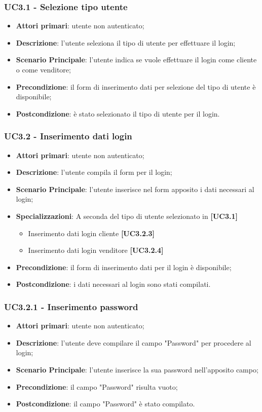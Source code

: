 \subsubsection{UC3.1 - Selezione tipo utente}
\begin{itemize}
\item \textbf{Attori primari}: utente non autenticato;
\item \textbf{Descrizione}: l'utente seleziona il tipo di utente per effettuare il login;
\item \textbf{Scenario Principale}: l'utente indica se vuole effettuare il login come cliente o come venditore;
\item \textbf{Precondizione}: il form di inserimento dati per selezione del tipo di utente è disponibile;
\item \textbf{Postcondizione}: è stato selezionato il tipo di utente per il login.
\end{itemize}

\subsubsection{UC3.2 - Inserimento dati login}
\begin{itemize}
\item \textbf{Attori primari}: utente non autenticato;
\item \textbf{Descrizione}: l'utente compila il form per il login;
\item \textbf{Scenario Principale}: l'utente inserisce nel form apposito i dati necessari al login;
\item \textbf{Specializzazioni}: A seconda del tipo di utente selezionato in \textbf{[UC3.1]}
\begin{itemize}
	\item Inserimento dati login cliente \textbf{[UC3.2.3]}
	\item Inserimento dati login venditore \textbf{[UC3.2.4]}
\end{itemize}
\item \textbf{Precondizione}: il form di inserimento dati per il login è disponibile;
\item \textbf{Postcondizione}: i dati necessari al login sono stati compilati.
\end{itemize}

\subsubsection{UC3.2.1 - Inserimento password}
\begin{itemize}
\item \textbf{Attori primari}: utente non autenticato;
\item \textbf{Descrizione}: l'utente deve compilare il campo "Password" per procedere al login;
\item \textbf{Scenario Principale}: l'utente inserisce la sua password nell'apposito campo;
\item \textbf{Precondizione}: il campo "Password" risulta vuoto;
\item \textbf{Postcondizione}: il campo "Password" è stato compilato.
\end{itemize}

